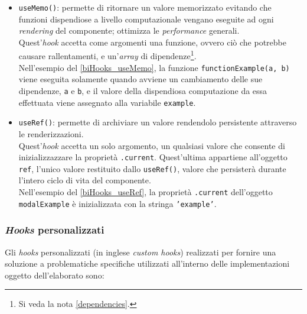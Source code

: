 \begin{itemize}
  
  
  \item {\texttt{useMemo()}}: permette di ritornare un valore memorizzato evitando che funzioni dispendiose a livello computazionale vengano eseguite ad ogni \textit{rendering} del componente; ottimizza le \textit{performance} generali.\\
  Quest'\textit{hook} accetta come argomenti una funzione, ovvero ciò che potrebbe causare rallentamenti, e un'\textit{array} di dipendenze\footnote{Si veda la nota \ref{dependencies}.}.\\
  Nell'esempio del \autoref{biHooks_useMemo}, la funzione \texttt{functionExample(a, b)} viene eseguita solamente quando avviene un cambiamento delle sue dipendenze, \texttt{a} e \texttt{b}, e il valore della dispendiosa computazione da essa effettuata viene assegnato alla variabile \texttt{example}.

  

  \item {\texttt{useRef()}}: permette di archiviare un valore rendendolo persistente attraverso le renderizzazioni.\\
  Quest'\textit{hook} accetta un solo argomento, un qualsiasi valore che consente di inizializzazzare la proprietà \texttt{.current}. Quest'ultima appartiene all'oggetto \texttt{ref}, l'unico valore restituito dallo \texttt{useRef()}, valore che persisterà durante l'intero ciclo di vita del componente.\\
  Nell'esempio del \autoref{biHooks_useRef}, la proprietà \texttt{.current} dell'oggetto \texttt{modalExample} è inizializzata con la stringa \texttt{'example'}.
  
  
\end{itemize}

\subsubsection{\textit{Hooks} personalizzati}
\label{subsubsec:Hooks personalizzati}
Gli \textit{hooks} personalizzati (in inglese \textit{custom hooks}) realizzati per fornire una soluzione a problematiche specifiche utilizzati all'interno delle implementazioni oggetto dell'elaborato sono:

